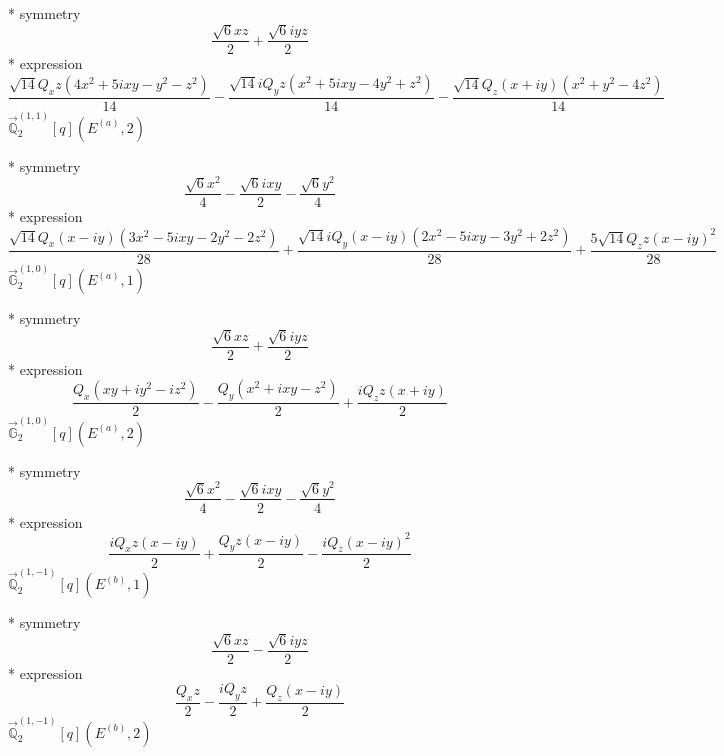 \documentclass[fleqn,8pt]{jsarticle}
\begin{document}
\noindent\quad ** symmetry
\begin{dmath*}
\frac{\sqrt{6} x z}{2} + \frac{\sqrt{6} i y z}{2}
\end{dmath*}
\noindent\quad ** expression
\begin{dmath*}
\frac{\sqrt{14} Q_{x} z \left(4 x^{2} + 5 i x y - y^{2} - z^{2}\right)}{14} - \frac{\sqrt{14} i Q_{y} z \left(x^{2} + 5 i x y - 4 y^{2} + z^{2}\right)}{14} - \frac{\sqrt{14} Q_{z} \left(x + i y\right) \left(x^{2} + y^{2} - 4 z^{2}\right)}{14}
\end{dmath*}
\noindent\quad $\vec{\mathbb{Q}}_{2}^{(1,1)}[q](E^{(a)},2)$

\noindent\quad ** symmetry
\begin{dmath*}
\frac{\sqrt{6} x^{2}}{4} - \frac{\sqrt{6} i x y}{2} - \frac{\sqrt{6} y^{2}}{4}
\end{dmath*}
\noindent\quad ** expression
\begin{dmath*}
\frac{\sqrt{14} Q_{x} \left(x - i y\right) \left(3 x^{2} - 5 i x y - 2 y^{2} - 2 z^{2}\right)}{28} + \frac{\sqrt{14} i Q_{y} \left(x - i y\right) \left(2 x^{2} - 5 i x y - 3 y^{2} + 2 z^{2}\right)}{28} + \frac{5 \sqrt{14} Q_{z} z \left(x - i y\right)^{2}}{28}
\end{dmath*}
\noindent\quad $\vec{\mathbb{G}}_{2}^{(1,0)}[q](E^{(a)},1)$

\noindent\quad ** symmetry
\begin{dmath*}
\frac{\sqrt{6} x z}{2} + \frac{\sqrt{6} i y z}{2}
\end{dmath*}
\noindent\quad ** expression
\begin{dmath*}
\frac{Q_{x} \left(x y + i y^{2} - i z^{2}\right)}{2} - \frac{Q_{y} \left(x^{2} + i x y - z^{2}\right)}{2} + \frac{i Q_{z} z \left(x + i y\right)}{2}
\end{dmath*}
\noindent\quad $\vec{\mathbb{G}}_{2}^{(1,0)}[q](E^{(a)},2)$

\noindent\quad ** symmetry
\begin{dmath*}
\frac{\sqrt{6} x^{2}}{4} - \frac{\sqrt{6} i x y}{2} - \frac{\sqrt{6} y^{2}}{4}
\end{dmath*}
\noindent\quad ** expression
\begin{dmath*}
\frac{i Q_{x} z \left(x - i y\right)}{2} + \frac{Q_{y} z \left(x - i y\right)}{2} - \frac{i Q_{z} \left(x - i y\right)^{2}}{2}
\end{dmath*}
\noindent\quad $\vec{\mathbb{Q}}_{2}^{(1,-1)}[q](E^{(b)},1)$

\noindent\quad ** symmetry
\begin{dmath*}
\frac{\sqrt{6} x z}{2} - \frac{\sqrt{6} i y z}{2}
\end{dmath*}
\noindent\quad ** expression
\begin{dmath*}
\frac{Q_{x} z}{2} - \frac{i Q_{y} z}{2} + \frac{Q_{z} \left(x - i y\right)}{2}
\end{dmath*}
\noindent\quad $\vec{\mathbb{Q}}_{2}^{(1,-1)}[q](E^{(b)},2)$
\end{document}
